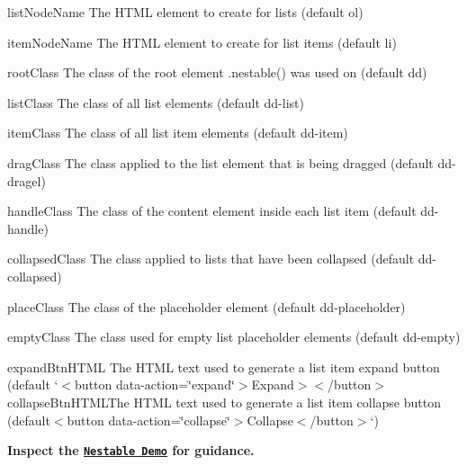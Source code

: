 \begin{DoxyItemize}
\item {\ttfamily list\+Node\+Name} The H\+T\+ML element to create for lists (default {\ttfamily \textquotesingle{}ol\textquotesingle{}})
\item {\ttfamily item\+Node\+Name} The H\+T\+ML element to create for list items (default {\ttfamily \textquotesingle{}li\textquotesingle{}})
\item {\ttfamily root\+Class} The class of the root element {\ttfamily .nestable()} was used on (default {\ttfamily \textquotesingle{}dd\textquotesingle{}})
\item {\ttfamily list\+Class} The class of all list elements (default {\ttfamily \textquotesingle{}dd-\/list\textquotesingle{}})
\item {\ttfamily item\+Class} The class of all list item elements (default {\ttfamily \textquotesingle{}dd-\/item\textquotesingle{}})
\item {\ttfamily drag\+Class} The class applied to the list element that is being dragged (default {\ttfamily \textquotesingle{}dd-\/dragel\textquotesingle{}})
\item {\ttfamily handle\+Class} The class of the content element inside each list item (default {\ttfamily \textquotesingle{}dd-\/handle\textquotesingle{}})
\item {\ttfamily collapsed\+Class} The class applied to lists that have been collapsed (default {\ttfamily \textquotesingle{}dd-\/collapsed\textquotesingle{}})
\item {\ttfamily place\+Class} The class of the placeholder element (default {\ttfamily \textquotesingle{}dd-\/placeholder\textquotesingle{}})
\item {\ttfamily empty\+Class} The class used for empty list placeholder elements (default {\ttfamily \textquotesingle{}dd-\/empty\textquotesingle{}})
\item {\ttfamily expand\+Btn\+H\+T\+ML} The H\+T\+ML text used to generate a list item expand button (default `\textquotesingle{}$<$button data-\/action=\char`\"{}expand\char`\"{}$>$Expand$>$$<$/button$>$\textquotesingle{}{\ttfamily ) $\ast$}collapse\+Btn\+H\+T\+ML{\ttfamily The H\+T\+ML text used to generate a list item collapse button (default}\textquotesingle{}$<$button data-\/action=\char`\"{}collapse\char`\"{}$>$Collapse$<$/button$>$\textquotesingle{}`)
\end{DoxyItemize}

{\bfseries Inspect the \href{http://dbushell.github.com/Nestable/}{\tt Nestable Demo} for guidance.}

